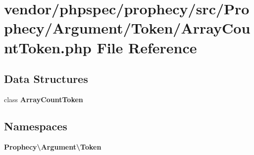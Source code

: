 \section{vendor/phpspec/prophecy/src/\+Prophecy/\+Argument/\+Token/\+Array\+Count\+Token.php File Reference}
\label{_array_count_token_8php}
\subsection*{Data Structures}
\begin{DoxyCompactItemize}
\item 
class {\bf Array\+Count\+Token}
\end{DoxyCompactItemize}
\subsection*{Namespaces}
\begin{DoxyCompactItemize}
\item 
 {\bf Prophecy\textbackslash{}\+Argument\textbackslash{}\+Token}
\end{DoxyCompactItemize}
